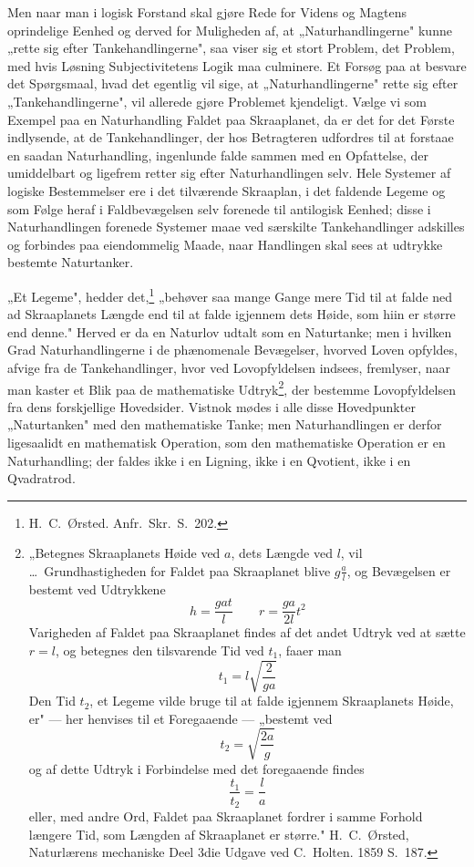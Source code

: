 \documentclass[12pt]{book}
\newcommand{\opage}[1]{\marginnote{\footnotesize\textit{[#1]}}}
\begin{document}
Men naar man i logisk Forstand skal gjøre Rede for Videns og Magtens oprindelige Eenhed og derved
for Muligheden af, at „Naturhandlingerne" kunne „rette sig efter Tankehandlingerne", saa viser sig
et stort Problem, det Problem, med hvis Løsning Subjectivitetens Logik maa culminere. Et Forsøg paa
at besvare det Spørgsmaal, hvad det egentlig vil sige, at „Naturhandlingerne" rette sig efter
„Tankehandlingerne", vil allerede gjøre Problemet kjendeligt. Vælge vi som Exempel paa en
Naturhandling Faldet paa Skraaplanet, da er det for det Første indlysende, at de Tankehandlinger,
der hos Betragteren udfordres til at forstaae en saadan Naturhandling, ingenlunde falde sammen med
en Opfattelse, der umiddelbart og ligefrem retter sig efter Naturhandlingen selv. Hele Systemer af
logiske Bestemmelser ere i det tilværende Skraaplan, i det faldende Legeme og som Følge heraf i
Faldbevægelsen selv forenede til antilogisk Eenhed; disse i Naturhandlingen forenede Systemer maae
ved særskilte Tankehandlinger adskilles og forbindes paa eiendommelig Maade, naar Handlingen skal
sees at udtrykke bestemte Naturtanker.

„Et Legeme", hedder det,\footnote{H.\ C.\ Ørsted. Anfr.\ Skr.\ S.~202.} „behøver saa mange Gange
mere Tid til at falde ned ad Skraaplanets Længde end til at falde igjennem dets Høide, som hiin er
større end denne." Herved er da en Naturlov udtalt som en Naturtanke; men i hvilken Grad
Naturhandlingerne i de phænomenale Bevægelser, hvorved Loven opfyldes, afvige fra de Tankehandlinger,
hvor%
\opage{211} ved Lovopfyldelsen indsees, fremlyser, naar man kaster et Blik paa de mathematiske
Udtryk\footnote{„Betegnes Skraaplanets Høide ved $a$, dets Længde ved $l$, vil \dots\
Grundhastigheden for Faldet paa Skraaplanet blive $g\frac{a}{l}$, og Bevægelsen er bestemt ved
Udtrykkene
\[ h = \frac{gat}{l} \qquad r = \frac{ga}{2l}t^{2} \]
Varigheden af Faldet paa Skraaplanet findes af det andet Udtryk ved at sætte $r = l$, og betegnes
den tilsvarende Tid ved $t_1$, faaer man
\[ t_1 = l\sqrt{\frac{2}{ga}} \]
Den Tid $t_2$, et Legeme vilde bruge til at falde igjennem Skraaplanets Høide, er" --- her henvises
til et Foregaaende --- „bestemt ved
\[ t_2 = \sqrt{\frac{2a}{g}} \]
og af dette Udtryk i Forbindelse med det foregaaende findes
\[ \frac{t_1}{t_2} = \frac{l}{a} \]
eller, med andre Ord, Faldet paa Skraaplanet fordrer i samme Forhold længere Tid, som Længden af
Skraaplanet er større." H.\ C.\ Ørsted, Naturlærens mechaniske Deel 3die Udgave ved C.\ Holten.
1859 S.~187.}, der bestemme Lovopfyldelsen fra dens forskjellige Hovedsider. Vistnok mødes i alle
disse Hovedpunkter „Naturtanken" med den mathematiske Tanke; men Naturhandlingen er derfor
ligesaalidt en mathematisk Operation, som den mathematiske Operation er en Naturhandling; der faldes
ikke i en Ligning, ikke i en Qvotient, ikke i en Qvadratrod.
\end{document}
